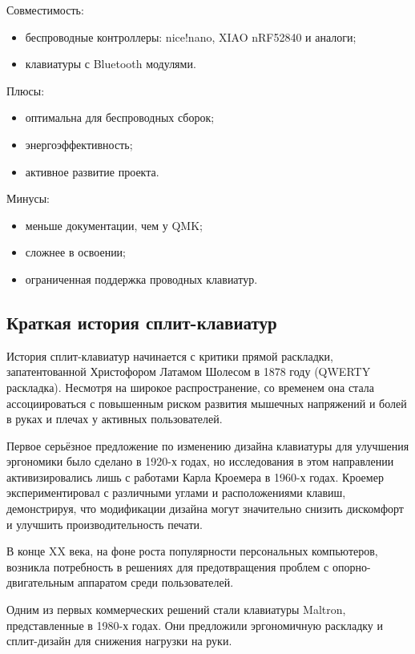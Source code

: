 Совместимость:

\begin{itemize}
\item беспроводные контроллеры: nice!nano, XIAO nRF52840 и аналоги;
\item клавиатуры с Bluetooth модулями.
\end{itemize}

Плюсы:

\begin{itemize}
\item оптимальна для беспроводных сборок;
\item энергоэффективность;
\item активное развитие проекта.
\end{itemize}

Минусы:

\begin{itemize}
\item меньше документации, чем у QMK;
\item сложнее в освоении;
\item ограниченная поддержка проводных клавиатур.
\end{itemize}

\subsection{Краткая история сплит-клавиатур}

История сплит-клавиатур начинается с критики прямой раскладки, запатентованной Христофором Латамом Шолесом в 1878 году (QWERTY раскладка). Несмотря на широкое распространение, со временем она стала ассоциироваться с повышенным риском развития мышечных напряжений и болей в руках и плечах у активных пользователей.

Первое серьёзное предложение по изменению дизайна клавиатуры для улучшения эргономики было сделано в 1920-х годах, но исследования в этом направлении активизировались лишь с работами Карла Кроемера в 1960-х годах. Кроемер экспериментировал с различными углами и расположениями клавиш, демонстрируя, что модификации дизайна могут значительно снизить дискомфорт и улучшить производительность печати.

В конце XX века, на фоне роста популярности персональных компьютеров, возникла потребность в решениях для предотвращения проблем с опорно-двигательным аппаратом среди пользователей.

Одним из первых коммерческих решений стали клавиатуры Maltron, представленные в 1980-х годах. Они предложили эргономичную раскладку и сплит-дизайн для снижения нагрузки на руки.

